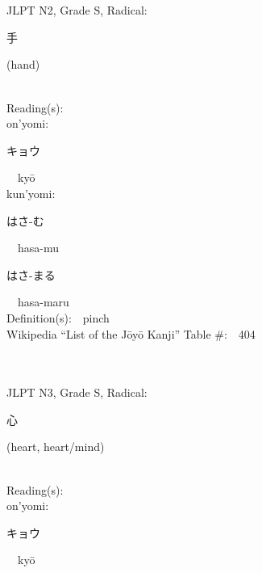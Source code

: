 \begin{multicols}{2}
\ \ \\
{\fontsize{34pt}{40pt}  }\ \ \\  %
{JLPT N2, Grade S, Radical:\ \ {\begin{CJK}{UTF8}{min} 手 \end{CJK}} (hand) } \\
Reading(s):\ \ \\
{\hspace*{1em}}on'yomi:\ \ \\
{\hspace*{2em}}{\begin{CJK}{UTF8}{min} キョウ \end{CJK}}\ \ ky\=o\ \ \\
{\hspace*{1em}}kun'yomi:\ \ \\
{\hspace*{2em}}{\begin{CJK}{UTF8}{min} はさ-む \end{CJK}}\ \ hasa-mu\ \ \\
{\hspace*{2em}}{\begin{CJK}{UTF8}{min} はさ-まる \end{CJK}}\ \ hasa-maru\ \ \\
Definition(s):\ \ pinch \\
Wikipedia ``List of the J\=oy\=o Kanji'' Table \#:\ \ 404 \\
\ \ \\
{\fontsize{34pt}{40pt}  }\ \ \\  %
{JLPT N3, Grade S, Radical:\ \ {\begin{CJK}{UTF8}{min} 心 \end{CJK}} (heart, heart/mind) } \\
Reading(s):\ \ \\
{\hspace*{1em}}on'yomi:\ \ \\
{\hspace*{2em}}{\begin{CJK}{UTF8}{min} キョウ \end{CJK}}\ \ ky\=o\ \ \\

\end{multicols}
